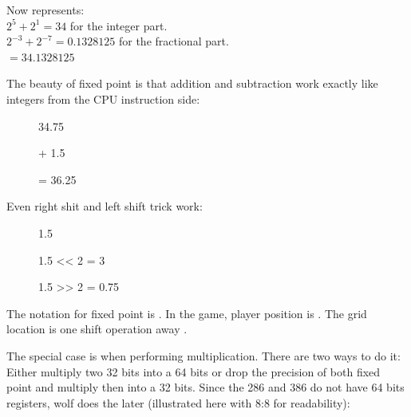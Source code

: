 Now represents:\\

$ 2^5 + 2^1 = 34 $ for the integer part.\\
$ 2^{-3}+2^{-7} = 0.1328125 $ for the fractional part.\\
$ = 34.1328125$\\

\bigskip

The beauty of fixed point is that addition and subtraction work exactly like integers from the CPU instruction side:\\




\par
\begin{figure}[H]
 \centering
   

   \caption{34.75} 
\end{figure} 

\begin{figure}[H]
 \centering
   
  \caption{+ 1.5} 
\end{figure} 

\begin{figure}[H]
 \centering
   
  {\caption{= 36.25}}
\end{figure} 
\par
 Even right shit and left shift trick work:\\
 
 \par
\begin{figure}[H]
 \centering
   
   \caption{1.5} 
\end{figure} 

\par
\begin{figure}[H]
 \centering
   
   \caption{1.5 << 2  = 3} 
\end{figure}

\par
\begin{figure}[H]
 \centering
   
   \caption{1.5 >> 2 = 0.75} 
\end{figure}

The notation for fixed point is . In the game, player position is . The grid location is one shift operation away .\\
\par
 The special case is when performing multiplication. There are two ways to do it: Either multiply two 32 bits into a 64 bits or drop the precision of both fixed point and multiply then into a 32 bits. Since the 286 and 386 do not have 64 bits registers, wolf does the later (illustrated here with 8:8 for readability):



